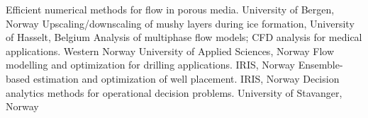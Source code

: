 {Efficient numerical methods for flow in porous media. University of Bergen, Norway}
{Upscaling/downscaling of mushy layers during ice formation, University of Hasselt, Belgium}
{Analysis of multiphase flow models; CFD analysis for medical applications. Western Norway University of Applied Sciences, Norway}
{Flow modelling and optimization for drilling applications. IRIS, Norway}
{Ensemble-based estimation and optimization of well placement. IRIS, Norway}
{Decision analytics methods for operational decision problems. University of Stavanger, Norway}

